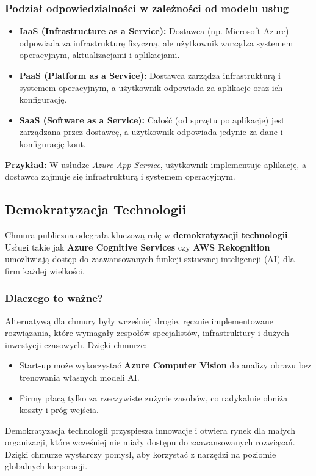 \documentclass{article}
\begin{document}
\subsubsection*{Podział odpowiedzialności w zależności od modelu usług}
\begin{itemize}
    \item \textbf{IaaS (Infrastructure as a Service):} Dostawca (np. Microsoft Azure) odpowiada za infrastrukturę fizyczną, ale użytkownik zarządza systemem operacyjnym, aktualizacjami i aplikacjami.
    \item \textbf{PaaS (Platform as a Service):} Dostawca zarządza infrastrukturą i systemem operacyjnym, a użytkownik odpowiada za aplikacje oraz ich konfigurację.
    \item \textbf{SaaS (Software as a Service):} Całość (od sprzętu po aplikacje) jest zarządzana przez dostawcę, a użytkownik odpowiada jedynie za dane i konfigurację kont.
\end{itemize}

\textbf{Przykład:} W usłudze \textit{Azure App Service}, użytkownik implementuje aplikację, a dostawca zajmuje się infrastrukturą i systemem operacyjnym.

\subsection{Demokratyzacja Technologii}
Chmura publiczna odegrała kluczową rolę w \textbf{demokratyzacji technologii}. Usługi takie jak \textbf{Azure Cognitive Services} czy \textbf{AWS Rekognition} umożliwiają dostęp do zaawansowanych funkcji sztucznej inteligencji (AI) dla firm każdej wielkości.

\subsubsection*{Dlaczego to ważne?}
Alternatywą dla chmury były wcześniej drogie, ręcznie implementowane rozwiązania, które wymagały zespołów specjalistów, infrastruktury i dużych inwestycji czasowych. Dzięki chmurze:
\begin{itemize}
    \item Start-up może wykorzystać \textbf{Azure Computer Vision} do analizy obrazu bez trenowania własnych modeli AI.
    \item Firmy płacą tylko za rzeczywiste zużycie zasobów, co radykalnie obniża koszty i próg wejścia.
\end{itemize}

Demokratyzacja technologii przyspiesza innowacje i otwiera rynek dla małych organizacji, które wcześniej nie miały dostępu do zaawansowanych rozwiązań. Dzięki chmurze wystarczy pomysł, aby korzystać z narzędzi na poziomie globalnych korporacji.
\end{document}
